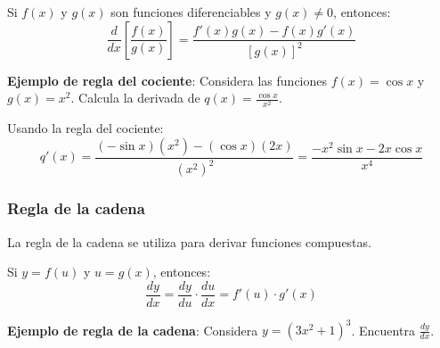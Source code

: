\documentclass[12pt]{article}
\begin{document}
Si \( f(x) \) y \( g(x) \) son funciones diferenciables y \( g(x) \neq 0 \), entonces:
\[ \frac{d}{dx}\left[\frac{f(x)}{g(x)}\right] = \frac{f'(x)g(x) - f(x)g'(x)}{[g(x)]^2} \]

\textbf{Ejemplo de regla del cociente}:
Considera las funciones \( f(x) = \cos x \) y \( g(x) = x^2 \).
Calcula la derivada de \( q(x) = \frac{\cos x}{x^2} \).

Usando la regla del cociente:
\[ q'(x) = \frac{(-\sin x)(x^2) - (\cos x)(2x)}{(x^2)^2} = \frac{-x^2 \sin x - 2x \cos x}{x^4} \]
\subsubsection{Regla de la cadena}

La regla de la cadena se utiliza para derivar funciones compuestas.

Si \( y = f(u) \) y \( u = g(x) \), entonces:
\[ \frac{dy}{dx} = \frac{dy}{du} \cdot \frac{du}{dx} = f'(u) \cdot g'(x) \]

\textbf{Ejemplo de regla de la cadena}:
Considera \( y = (3x^2 + 1)^3 \).
Encuentra \( \frac{dy}{dx} \).
\end{document}
